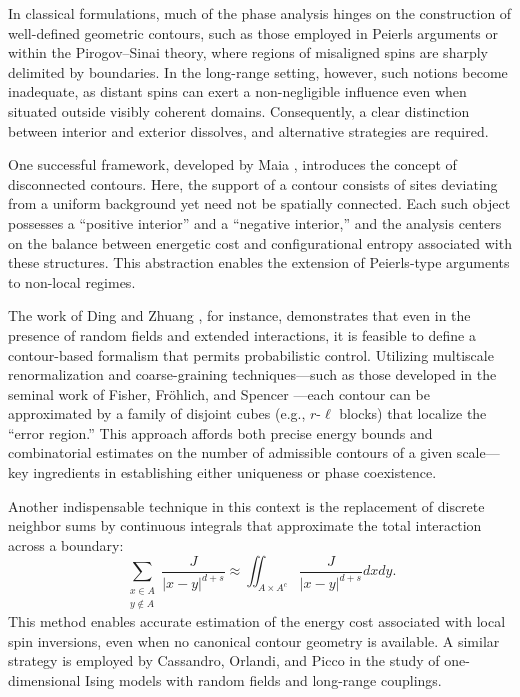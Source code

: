 \documentclass{article}
\begin{document}
In classical formulations, much of the phase analysis hinges on the construction of well-defined geometric contours, such as those employed in Peierls arguments or within the Pirogov--Sinai theory, where regions of misaligned spins are sharply delimited by boundaries. In the long-range setting, however, such notions become inadequate, as distant spins can exert a non-negligible influence even when situated outside visibly coherent domains. Consequently, a clear distinction between interior and exterior dissolves, and alternative strategies are required.

One successful framework, developed by Maia \cite{maia2024}, introduces the concept of disconnected contours. Here, the support of a contour consists of sites deviating from a uniform background yet need not be spatially connected. Each such object possesses a ``positive interior'' and a ``negative interior,'' and the analysis centers on the balance between energetic cost and configurational entropy associated with these structures. This abstraction enables the extension of Peierls-type arguments to non-local regimes.

The work of Ding and Zhuang \cite{ding2024}, for instance, demonstrates that even in the presence of random fields and extended interactions, it is feasible to define a contour-based formalism that permits probabilistic control. Utilizing multiscale renormalization and coarse-graining techniques---such as those developed in the seminal work of Fisher, Fr\"ohlich, and Spencer \cite{fisher1984}---each contour can be approximated by a family of disjoint cubes (e.g., $r$-$\ell$ blocks) that localize the ``error region.'' This approach affords both precise energy bounds and combinatorial estimates on the number of admissible contours of a given scale---key ingredients in establishing either uniqueness or phase coexistence.

Another indispensable technique in this context is the replacement of discrete neighbor sums by continuous integrals that approximate the total interaction across a boundary:
\[
\sum_{\substack{x\in A\\ y\notin A}} \frac{J}{|x-y|^{d+s}} \approx \iint_{A\times A^c} \frac{J}{|x-y|^{d+s}} dxdy.
\]
This method enables accurate estimation of the energy cost associated with local spin inversions, even when no canonical contour geometry is available. A similar strategy is employed by Cassandro, Orlandi, and Picco \cite{cassandro2012} in the study of one-dimensional Ising models with random fields and long-range couplings.
\end{document}
